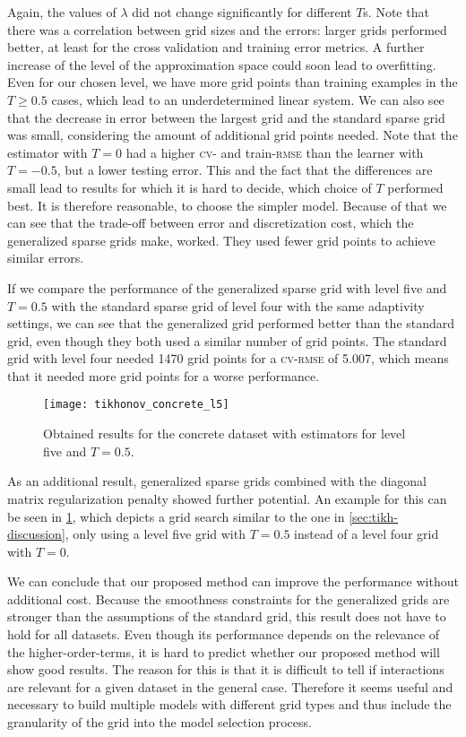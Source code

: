 Again, the values of \(\lambda\) did not change significantly for different \(T\)s.
Note that there was a correlation between grid sizes and the errors: larger grids
performed better, at least for the cross validation and training error metrics.
A further increase of the level of the approximation space could soon lead to overfitting.
Even for our chosen level, we have more grid points than training examples in the \(T \geq 0.5\) cases, which lead to an underdetermined linear system.
We can also see that the decrease in error between the largest grid and the standard sparse grid was small, considering the amount of additional grid points needed.
Note that the estimator with \(T = 0\) had a higher \textsc{cv}- and
train-\textsc{rmse} than the learner with \(T = -0.5\), but a lower testing
error.
This and the fact that the differences are small lead to results for which it is hard to decide, which choice of \(T\) performed best.
It is therefore reasonable, to choose the simpler model.
Because of that we can see that the trade-off between error and discretization cost, which the generalized sparse grids make, worked.
They used fewer grid points to achieve similar errors.

If we compare the performance of the generalized sparse grid with level five and
\(T = 0.5\) with the standard sparse grid of level four with the same adaptivity
settings, we can see that the generalized grid performed better than the standard grid, even though they both
used a similar number of grid points.
The standard grid with level four needed 1470 grid points for a \textsc{cv-rmse}
of 5.007, which means that it needed more grid points for a worse performance.

\begin{figure}[htb]
  \centering
  \texttt{[image: tikhonov\_concrete\_l5]}
  \caption{Obtained results for the concrete dataset with estimators for level five and \(T = 0.5\).}
  \label{fig:tikhonov-concrete-l5}
\end{figure}

As an additional result, generalized sparse grids combined with the diagonal
matrix regularization penalty showed further potential.
An example for this can be seen in \cref{fig:tikhonov-concrete-l5}, which depicts a grid search
similar to the one in \cref{sec:tikh-discussion}, only using a level five grid
with \(T = 0.5\) instead of a level four grid with \(T = 0\).

We can conclude that our proposed method can improve the performance without additional cost.
Because the smoothness constraints for the generalized grids are stronger than the assumptions of the standard grid, this result does not have to hold for all datasets.
Even though its performance depends on the relevance of the higher-order-terms, it is hard to predict whether our proposed method will show good results.
The reason for this is that it is difficult to tell if interactions are relevant for a given dataset in the general case.
Therefore it seems useful and necessary to build multiple models with different grid types and thus include the granularity of the grid into the model selection process.

